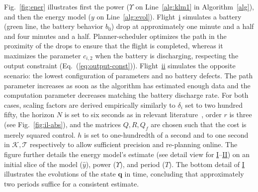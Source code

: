 \documentclass[letterpaper,10pt,journal,twoside]{IEEEtran}
\theoremstyle{definition}
\begin{document}
Fig.~\ref{fig:ener} %
illustrates first the power ($\Upsilon$ on Line~\ref{alg:klm1} in Algorithm~\ref{alg}), and then the energy model ($y$ on Line~\ref{alg:evol}).
Flight~\hyperref[fig:ener-dyn-i]{i} simulates a battery (green line, the battery behavior $b_0$) drop at approximately one minute and a half and four minutes and a half. Planner-scheduler optimizes the path in the proximity of the drops to ensure that the flight is completed, whereas it maximizes the parameter $c_{i,2}$ when the battery is discharging, respecting the output constraint (Eq.~(\ref{eq:output-const})). Flight~\hyperref[fig:ener-dyn-ii]{ii} simulates the opposite scenario: the lowest configuration of parameters and no battery defects. The path parameter increases as soon as the algorithm has estimated enough data %
and the computation parameter decreases matching the battery discharge rate. For both cases, scaling factors are derived empirically %
{\color{blue}similarly to $\delta_i$ set to two hundred fifty}, 
the horizon $N$ is set to six seconds {\color{blue} as in} relevant literature~\cite{gavilan2015iterative,%
stastny2018nonlinear%
}, order $r$ is three (see Fig.~\ref{fig:il-abs}), and the matrices $Q,R,Q_f$ are chosen such that the cost is merely squared control. {\color{blue} $h$ is set to one-hundredth of a second and to one second in $\mathcal{K}, \mathcal{T}$ respectively to allow sufficient precision and re-planning online.}
The figure further details the energy model's estimate (see detail view for \hyperref[fig:ener:static-I]{I}--\hyperref[fig:ener:static-II]{II}) on an initial slice of the model (${\hat{y}}$), power ($\Upsilon$), and period ($T$). %
The bottom detail of \hyperref[fig:ener:static-I]{I} illustrates the evolutions of the state $\mathbf{q}$ in time, concluding that approximately two periods suffice for a consistent %
estimate. %
\end{document}

